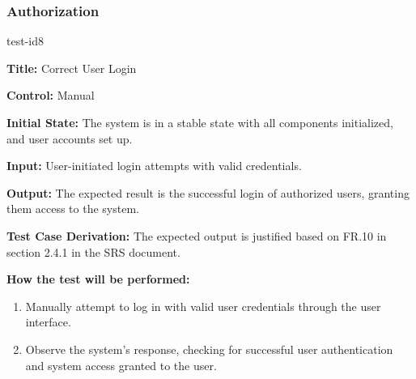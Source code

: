 \documentclass[12pt, titlepage]{article}
\begin{document}
\subsubsection{Authorization}
\hypertarget{Auth}{}
\begin{itemize}
    \begin{item}
        test-id8
        \begin{mdframed}[linewidth=0.5mm]
            \textbf{Title:} Correct User Login \par
            \textbf{Control:} Manual \par
            \textbf{Initial State:} The system is in a stable state with all components initialized, and user accounts set up. \par
            \textbf{Input:} User-initiated login attempts with valid credentials. \par
            \textbf{Output:} The expected result is the successful login of authorized users, granting them access to the system. \par
            \textbf{Test Case Derivation:} The expected output is justified based on FR.10 in section 2.4.1 in the SRS document. \par
            \textbf{How the test will be performed:}
            \begin{enumerate}[noitemsep]
                \item Manually attempt to log in with valid user credentials through the user interface.
                \item Observe the system's response, checking for successful user authentication and system access granted to the user.
            \end{enumerate}
        \end{mdframed}
    \end{item}


\end{itemize}
\end{document}
